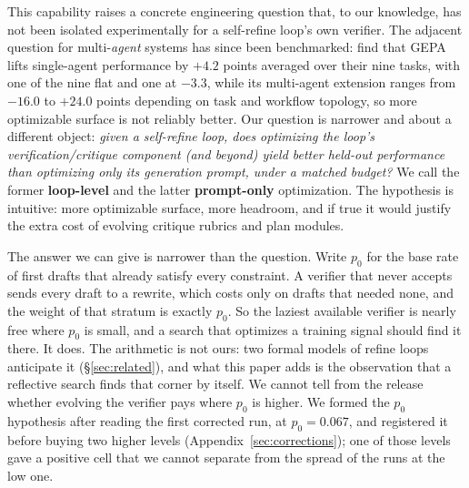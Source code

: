 \documentclass[11pt]{article}
\begin{document}
This capability raises a concrete engineering question that, to our knowledge,
has not been isolated experimentally for a self-refine loop's own verifier. The
adjacent question for multi-\emph{agent} systems has since been benchmarked:
\citet{bai2026masprompt} find that GEPA lifts single-agent performance by $+4.2$ points
averaged over their nine tasks, with one of the nine flat and one at $-3.3$, while its
multi-agent extension ranges from $-16.0$ to
$+24.0$ points depending on task and workflow topology, so more optimizable surface is not reliably
better. Our question is narrower and about a different object: \emph{given a self-refine loop, does
optimizing the loop's verification/critique component (and beyond) yield better
held-out performance than optimizing only its generation prompt, under a matched
budget?} We call the former \textbf{loop-level} and the latter
\textbf{prompt-only} optimization. The hypothesis is intuitive: more
optimizable surface, more headroom, and if true it would justify the extra
cost of evolving critique rubrics and plan modules.

The answer we can give is narrower than the question. Write $p_0$ for the base rate of first
drafts that already satisfy every constraint. A verifier that never accepts sends every draft to a
rewrite, which costs only on drafts that needed none, and the weight of that stratum is exactly
$p_0$. So the laziest available verifier is nearly free where $p_0$ is small, and a search that
optimizes a training signal should find it there. It does. The arithmetic is not ours: two formal
models of refine loops anticipate it (\S\ref{sec:related}), and what this paper adds is the
observation that a reflective search finds that corner by itself. We cannot tell from the release
whether evolving the verifier pays where $p_0$ is higher. We formed the $p_0$ hypothesis after
reading the first corrected run, at $p_0 = 0.067$, and registered it before buying two higher
levels (Appendix~\ref{sec:corrections}); one of those levels gave a positive cell that we cannot
separate from the spread of the runs at the low one.
\end{document}
